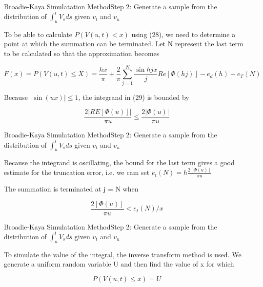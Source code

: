\begin{frame}{Broadie-Kaya Simulatation Method}{Step 2:  Generate a sample from the distribution of $\int_{u}^t V_s ds$ given $v_t$ and $v_u$}


    To be able to calculate $P(V(u, t) < x )$ using (28), we
    need to determine a point at which the summation can be
    terminated. Let N represent the last term to be calculated
    so that the approximation becomes

     \begin{equation}
        F(x) = P(V(u, t) \leq X) = \frac{hx}{\pi} + \frac{2}{\pi} \sum_{j=1}^N \frac{\sin hjx}{j} Re[\Phi(hj)] - e_d(h) - e_T(N)
    \end{equation}

    Because $|\sin(ux)| \leq 1$, the integrand in (29) is bounded by
     
    \begin{equation}
        \frac{2|RE[\Phi(u)]|}{\pi u} \leq \frac{2|\Phi(u)|}{\pi u}
    \end{equation}

    

\end{frame}

\begin{frame}{Broadie-Kaya Simulatation Method}{Step 2:  Generate a sample from the distribution of $\int_{u}^t V_s ds$ given $v_t$ and $v_u$}
    
    Because the integrand is oscillating, the bound for the last term gives a good estimate for the truncation error, i.e. we cam set $e_t(N) = h \frac{2[\Phi(u)]}{\pi u} $ 
    
    The summation is terminated at j = N when

    \begin{equation}
        \frac{2[\Phi(u)]}{\pi u} < e_t(N)/x
     \end{equation}
    
\end{frame}



\begin{frame}{Broadie-Kaya Simulatation Method}{Step 2:  Generate a sample from the distribution of $\int_{u}^t V_s ds$ given $v_t$ and $v_u$}

    
    To simulate the value of the integral, the inverse transform method is used. We generate a uniform random variable U and then find the value of x for which 

    \begin{equation}
        P(V(u, t) \leq x) = U
    \end{equation}

\end{frame}


